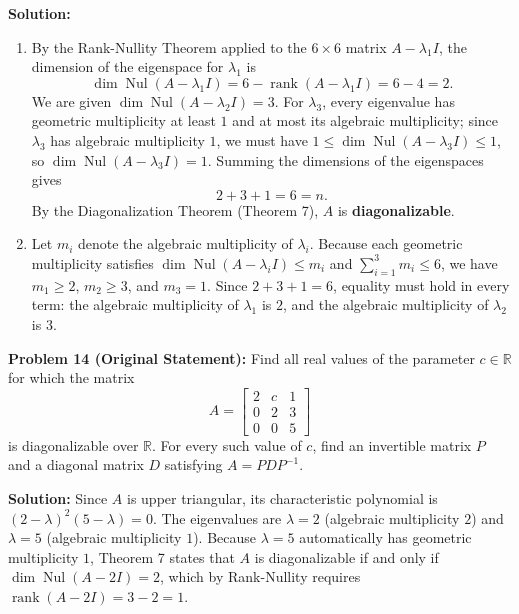 \documentclass[11pt, letterpaper]{article}
\theoremstyle{definition}
\theoremstyle{remark}
\begin{document}
\textbf{Solution:}
\begin{enumerate}[label=(\alph*)]
    \item By the Rank-Nullity Theorem applied to the $6 \times 6$ matrix $A - \lambda_{1}I$, the dimension of the eigenspace for $\lambda_{1}$ is
    \[
    \dim\operatorname{Nul}(A - \lambda_{1}I) = 6 - \operatorname{rank}(A - \lambda_{1}I) = 6 - 4 = 2.
    \]
    We are given $\dim\operatorname{Nul}(A - \lambda_{2}I) = 3$. For $\lambda_{3}$, every eigenvalue has geometric multiplicity at least $1$ and at most its algebraic multiplicity; since $\lambda_{3}$ has algebraic multiplicity $1$, we must have $1 \le \dim\operatorname{Nul}(A - \lambda_{3}I) \le 1$, so $\dim\operatorname{Nul}(A - \lambda_{3}I) = 1$. Summing the dimensions of the eigenspaces gives
    \[
    2 + 3 + 1 = 6 = n.
    \]
    By the Diagonalization Theorem (Theorem 7), $A$ is \textbf{diagonalizable}.

    \item Let $m_{i}$ denote the algebraic multiplicity of $\lambda_{i}$. Because each geometric multiplicity satisfies $\dim\operatorname{Nul}(A - \lambda_{i}I) \le m_{i}$ and $\sum_{i=1}^{3} m_{i} \le 6$, we have $m_{1} \ge 2$, $m_{2} \ge 3$, and $m_{3} = 1$. Since $2 + 3 + 1 = 6$, equality must hold in every term: the algebraic multiplicity of $\lambda_{1}$ is $2$, and the algebraic multiplicity of $\lambda_{2}$ is $3$.
\end{enumerate}

\vspace{0.8em}
\textbf{Problem 14 (Original Statement):}
Find all real values of the parameter $c \in \mathbb{R}$ for which the matrix
\[
A = \begin{bmatrix} 2 & c & 1 \\ 0 & 2 & 3 \\ 0 & 0 & 5 \end{bmatrix}
\]
is diagonalizable over $\mathbb{R}$. For every such value of $c$, find an invertible matrix $P$ and a diagonal matrix $D$ satisfying $A = PDP^{-1}$.

\textbf{Solution:}
Since $A$ is upper triangular, its characteristic polynomial is $(2 - \lambda)^{2}(5 - \lambda) = 0$. The eigenvalues are $\lambda = 2$ (algebraic multiplicity $2$) and $\lambda = 5$ (algebraic multiplicity $1$). Because $\lambda = 5$ automatically has geometric multiplicity $1$, Theorem 7 states that $A$ is diagonalizable if and only if $\dim\operatorname{Nul}(A - 2I) = 2$, which by Rank-Nullity requires $\operatorname{rank}(A - 2I) = 3 - 2 = 1$.
\end{document}
